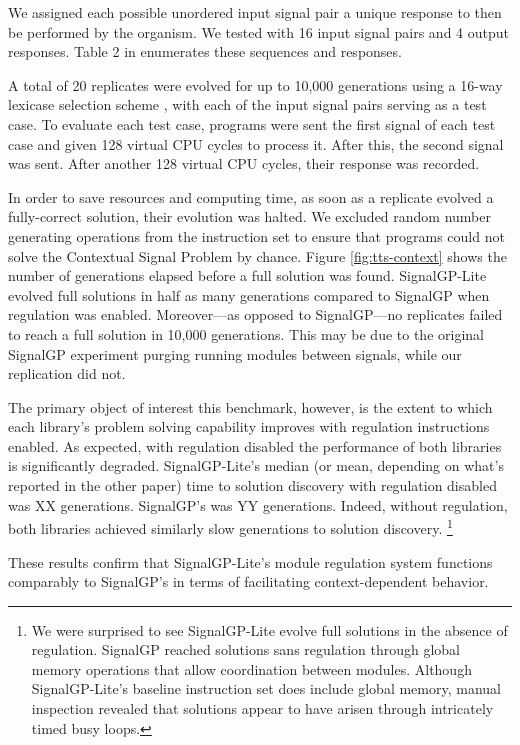 We assigned each possible unordered input signal pair a unique response to then be performed by the organism.
We tested with 16 input signal pairs and 4 output responses.
Table 2 in \citep{lalejini_tag-based_2021} enumerates these sequences and responses.

A total of 20 replicates were evolved for up to 10,000 generations using a 16-way lexicase selection scheme \citep{spector2012assessment}, with each of the input signal pairs serving as a test case.
To evaluate each test case, programs were sent the first signal of each test case and given 128 virtual CPU cycles to process it.
After this, the second signal was sent.
After another 128 virtual CPU cycles, their response was recorded.

In order to save resources and computing time, as soon as a replicate evolved a fully-correct solution, their evolution was halted.
We excluded random number generating operations from the instruction set to ensure that programs could not solve the Contextual Signal Problem by chance.
Figure \ref{fig:tts-context} shows the number of generations elapsed before a full solution was found.
SignalGP-Lite evolved full solutions in half as many generations compared to SignalGP when regulation was enabled.
Moreover---as opposed to SignalGP---no replicates failed to reach a full solution in 10,000 generations.
This may be due to the original SignalGP experiment purging running modules between signals, while our replication did not.

The primary object of interest this benchmark, however, is the extent to which each library's problem solving capability improves with regulation instructions enabled.
As expected, with regulation disabled the performance of both libraries is significantly degraded.
SignalGP-Lite's median (or mean, depending on what's reported in the other paper) time to solution discovery with regulation disabled was XX generations.
SignalGP's was YY generations.
Indeed, without regulation, both libraries achieved similarly slow generations to solution discovery.
\footnote{
We were surprised to see SignalGP-Lite evolve full solutions in the absence of regulation.
SignalGP reached solutions sans regulation through global memory operations that allow coordination between modules.
Although SignalGP-Lite's baseline instruction set does include global memory, manual inspection revealed that solutions appear to have arisen through intricately timed busy loops.
}

These results confirm that SignalGP-Lite's module regulation system functions comparably to SignalGP's in terms of facilitating context-dependent behavior.
